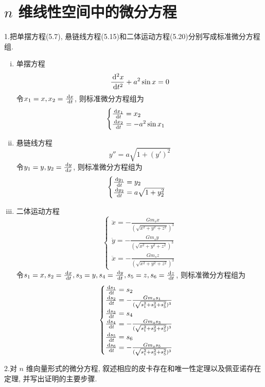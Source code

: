\section{$n$ 维线性空间中的微分方程}


1.把单摆方程(5.7), 悬链线方程(5.15)和二体运动方程(5.20)分别写成标准微分方程组.

\begin{solve} 
\begin{enumerate}[(i)]
\item 单摆方程\[\frac{\,\mathrm{d}^2x}{\,\mathrm{d} t^2}+a^2\sin x=0\]
令$x_1=x,x_2=\frac{\,\mathrm{d} x}{\,\mathrm{d} t}$, 则标准微分方程组为
\[\begin{cases}
\frac{\,\mathrm{d} x_1}{\,\mathrm{d} t}=x_2\\\frac{\,\mathrm{d} x_2}{\,\mathrm{d} t}=-a^2\sin x_1
\end{cases}\]
\item 悬链线方程\[y''=a\sqrt{1+(y')^2}\]
令$y_1=y,y_2=\frac{\,\mathrm{d} y}{\,\mathrm{d} x}$, 则标准微分方程组为
\[\begin{cases}
\frac{\,\mathrm{d} y_1}{\,\mathrm{d} t}=y_2\\\frac{\,\mathrm{d} y_2}{\,\mathrm{d} t}=a\sqrt{1+y_2^2}
\end{cases}\]
\item 二体运动方程
\[\begin{cases}
\ddot{x}=-\frac{Gm_sx}{(\sqrt{x^2+y^2+z^2})^3}\\
\ddot{y}=-\frac{Gm_sy}{(\sqrt{x^2+y^2+z^2})^3}\\
\ddot{x}=-\frac{Gm_sz}{(\sqrt{x^2+y^2+z^2})^3}
\end{cases}\]
令$s_1=x,s_2=\frac{\,\mathrm{d} x}{\,\mathrm{d} t},s_3=y,s_4=\frac{\,\mathrm{d} y}{\,\mathrm{d} t},s_5=z,s_6=\frac{\,\mathrm{d} z}{\,\mathrm{d} t}$, 则标准微分方程组为
\[\begin{cases}
\frac{\,\mathrm{d} s_1}{\,\mathrm{d} t}=s_2\\
\frac{\,\mathrm{d} s_2}{\,\mathrm{d} t}=-\frac{Gm_ss_1}{(\sqrt{s_1^2+s_3^2+s_5^2})^3}\\
\frac{\,\mathrm{d} s_3}{\,\mathrm{d} t}=s_4\\
\frac{\,\mathrm{d} s_4}{\,\mathrm{d} t}=-\frac{Gm_ss_3}{(\sqrt{s_1^2+s_3^2+s_5^2})^3}\\
\frac{\,\mathrm{d} s_5}{\,\mathrm{d} t}=s_6\\
\frac{\,\mathrm{d} s_6}{\,\mathrm{d} t}=-\frac{Gm_ss_5}{(\sqrt{s_1^2+s_3^2+s_5^2})^3}
\end{cases}\]
\end{enumerate}
\end{solve}


2.对 $n$ 维向量形式的微分方程, 叙述相应的皮卡存在和唯一性定理以及佩亚诺存在定理, 并写出证明的主要步骤.

